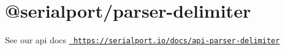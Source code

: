 \chapter{@serialport/parser-\/delimiter}
\hypertarget{md_Dashboard_2node__modules_2_0dserialport_2parser-delimiter_2README}{}\label{md_Dashboard_2node__modules_2_0dserialport_2parser-delimiter_2README}
\label{md_Dashboard_2node__modules_2_0dserialport_2parser-delimiter_2README_autotoc_md85}%
%
 See our api docs \href{https://serialport.io/docs/api-parser-delimiter}{\texttt{ https\+://serialport.\+io/docs/api-\/parser-\/delimiter}} 
